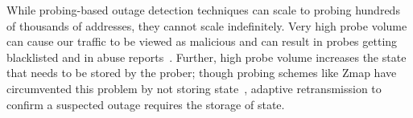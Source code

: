 While probing-based outage detection techniques can scale to probing hundreds
of thousands of addresses, they cannot scale indefinitely. Very high
probe volume can cause our traffic to be viewed as malicious and can
result in probes getting blacklisted and in abuse
reports~\cite{durumeric2013zmap}. Further, high probe volume increases
the state that needs to be stored by the prober; though probing
schemes like Zmap have circumvented this problem by not storing
state~\cite{durumeric2013zmap}, adaptive retransmission to confirm a
suspected outage requires the storage of state.






